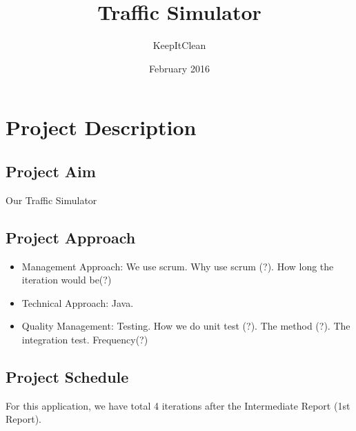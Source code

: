 \documentclass[11pt]{article}
\author{KeepItClean}
\title{Traffic Simulator}
\date{February 2016}
\begin{document}
\maketitle
\newpage

\section{Project Description}
\subsection{Project Aim}
Our Traffic Simulator 
\subsection{Project Approach}
\begin{itemize}
	\item Management Approach: We use scrum. Why use scrum (?). How long the iteration would be(?)
	\item Technical Approach: Java. 
	\item Quality Management: Testing. How we do unit test (?). The method (?). The integration test. Frequency(?)
\end{itemize}
\subsection{Project Schedule}

 For this application, we have total 4 iterations after the Intermediate Report (1st Report). 
 
\end{document}
